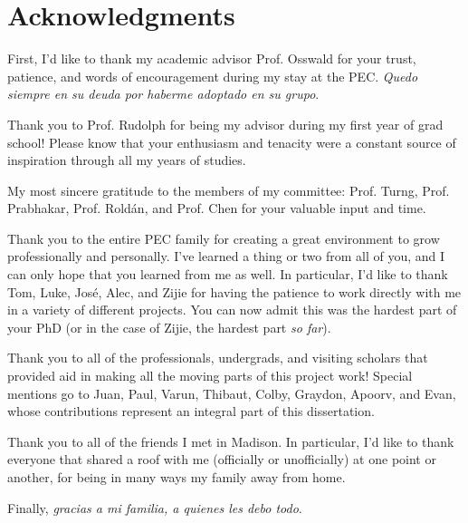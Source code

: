 \documentclass[main.tex]{subfiles}
\begin{document}
\chapter*{Acknowledgments}
{
\setlength{\parindent}{0cm}
\setlength{\parskip}{12pt}

First, I'd like to thank my academic advisor Prof. Osswald for your trust,  patience, and words of encouragement during my stay at the PEC. \emph{Quedo siempre en su deuda por haberme adoptado en su grupo}.

Thank you to Prof. Rudolph for being my advisor during my first year of grad school! Please know that your enthusiasm and tenacity were a constant source of inspiration through all my years of studies. 

My most sincere gratitude to the members of my committee: Prof. Turng, Prof. Prabhakar, Prof. Rold\'an, and Prof. Chen for your valuable input and time.

Thank you to the entire PEC family for creating a great environment to grow professionally and personally. I've learned a thing or two from all of you, and I can only hope that you learned from me as well. In particular, I'd like to thank Tom, Luke, Jos\'e, Alec, and Zijie for having the patience to work directly with me in a variety of different projects. You can now admit this was the hardest part of your PhD (or in the case of Zijie, the hardest part \emph{so far}).

Thank you to all of the professionals, undergrads, and visiting scholars that provided aid in making all the moving parts of this project work! Special mentions go to Juan, Paul, Varun, Thibaut, Colby, Graydon, Apoorv, and Evan, whose contributions represent an integral part of this dissertation.

Thank you to all of the friends I met in Madison. In particular, I'd like to thank everyone that shared a roof with me (officially or unofficially) at one point or another, for being in many ways my family away from home. 

Finally, \emph{gracias a mi familia, a quienes les debo todo}. 

}
\end{document}
